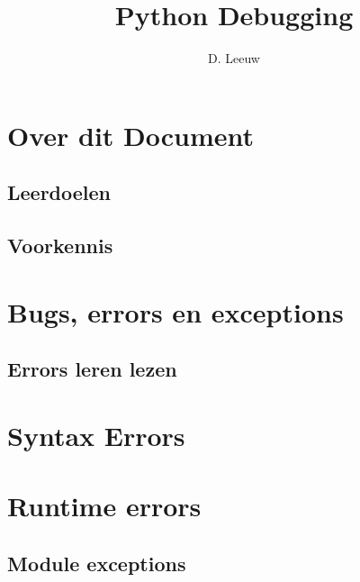 \documentclass[a4paper,12pt,twoside,openright,titlepage]{article}
\author{D. Leeuw}
\title{Python Debugging}
\date{\today\\
1.0.0\\
\vfill
\raggedright
\copyright\ 2025 Dennis Leeuw\\
}
\begin{document}

\maketitle


\section{Over dit Document}
\subsection{Leerdoelen}

\subsection{Voorkennis}




\section{Bugs, errors en exceptions}

\subsection{Errors leren lezen}


\section{Syntax Errors}


\section{Runtime errors}

\subsection{Module exceptions}


\printindex
\end{document}
